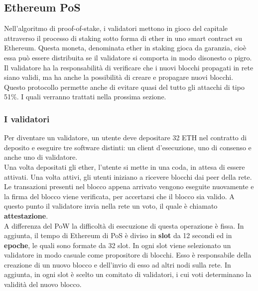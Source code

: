 \documentclass[a4paper,11pt]{report}
\begin{document}
\subsection{Ethereum PoS}
Nell'algoritmo di proof-of-stake, i validatori mettono in gioco del capitale attraverso il processo di staking sotto forma di ether in uno smart contract su Ethereum. Questa moneta, denominata ether in staking gioca da garanzia, cioè essa può essere distribuita se il validatore si comporta in modo disonesto o pigro. Il validatore ha la responsabilità di verificare che i nuovi blocchi propagati in rete siano validi, ma ha anche la possibilità di creare e propagare nuovi blocchi. \\
Questo protocollo permette anche di evitare quasi del tutto gli attacchi di tipo 51\%. I quali verranno trattati nella prossima sezione.

\subsubsection{I validatori}
Per diventare un validatore, un utente deve depositare 32 ETH nel contratto di deposito e eseguire tre software distinti: un client d'esecuzione, uno di consenso e anche uno di validatore.\\
Una volta depositati gli ether, l'utente si mette in una coda, in attesa di essere attivati. Una volta attivi, gli utenti iniziano a ricevere blocchi dai peer della rete. Le transazioni presenti nel blocco appena arrivato vengono eseguite nuovamente e la firma del blocco viene verificata, per accertarsi che il blocco sia valido. A questo punto il validatore invia nella rete un voto, il quale è chiamato \textbf{attestazione}.\\

A differenza del PoW la difficoltà di esecuzione di questa operazione è fissa. In aggiunta, il tempo di Ethereum di PoS è diviso in \textbf{slot} da 12 secondi ed in \textbf{epoche}, le quali sono formate da 32 slot. In ogni slot viene selezionato un validatore in modo casuale come propositore di blocchi. Esso è responsabile della creazione di un nuovo blocco e dell'invio di esso ad altri nodi sulla rete. In aggiunta, in ogni slot è scelto un comitato di validatori, i cui voti determinano la validità del nuovo blocco. 
\end{document}
